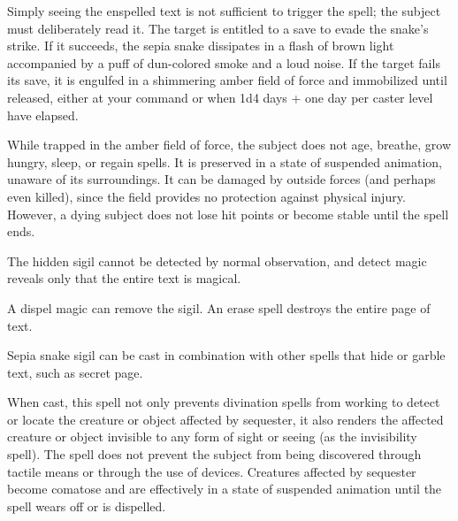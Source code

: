 \begin{multicols}{2}
\begin{small}
\smallskip\noindent Simply seeing the enspelled text is not sufficient to trigger the spell; the subject must deliberately read it. The target is entitled to a save to evade the snake's strike. If it succeeds, the sepia snake dissipates in a flash of brown light accompanied by a puff of dun-colored smoke and a loud noise. If the target fails its save, it is engulfed in a shimmering amber field of force and immobilized until released, either at your command or when 1d4 days + one day per caster level have elapsed.

\smallskip\noindent While trapped in the amber field of force, the subject does not age, breathe, grow hungry, sleep, or regain spells. It is preserved in a state of suspended animation, unaware of its surroundings. It can be damaged by outside forces (and perhaps even killed), since the field provides no protection against physical injury. However, a dying subject does not lose hit points or become stable until the spell ends.

\smallskip\noindent The hidden sigil cannot be detected by normal observation, and detect magic reveals only that the entire text is magical.

\smallskip\noindent A dispel magic can remove the sigil. An erase spell destroys the entire page of text.

\smallskip\noindent Sepia snake sigil can be cast in combination with other spells that hide or garble text, such as secret page.


\noindent When cast, this spell not only prevents divination spells from working to detect or locate the creature or object affected by sequester, it also renders the affected creature or object invisible to any form of sight or seeing (as the invisibility spell). The spell does not prevent the subject from being discovered through tactile means or through the use of devices. Creatures affected by sequester become comatose and are effectively in a state of suspended animation until the spell wears off or is dispelled.


\end{small}
\end{multicols}
